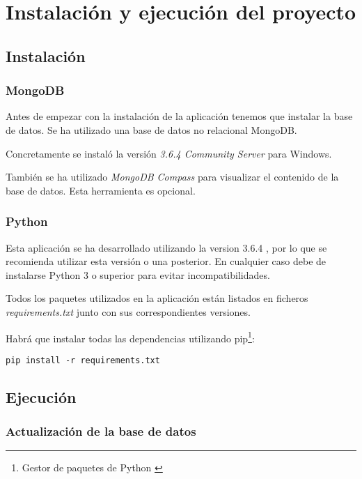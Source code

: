 \section{Instalación y ejecución del proyecto} \label{instalacionprogramador}

\subsection{Instalación}

\subsubsection{MongoDB}

Antes de empezar con la instalación de la aplicación tenemos que instalar la base de datos.
Se ha utilizado una base de datos no relacional MongoDB.

Concretamente se instaló la versión \textit{3.6.4 Community Server} \cite{misc:mongodb} para Windows.

También se ha utilizado \textit{MongoDB Compass} \cite{misc:mongodb} para visualizar el contenido de la base de datos. Esta herramienta es opcional.

\subsubsection{Python}

Esta aplicación se ha desarrollado utilizando la version 3.6.4 \cite{misc:python3}, por lo que se recomienda utilizar esta versión o una posterior. En cualquier caso debe de instalarse Python 3 o superior para evitar incompatibilidades.

Todos los paquetes utilizados en la aplicación están listados en ficheros \textit{requirements.txt} junto con sus correspondientes versiones.

Habrá que instalar todas las dependencias utilizando pip\footnote{Gestor de paquetes de Python \cite{wiki:pip}}:

\begin{lstlisting}
pip install -r requirements.txt
\end{lstlisting}

\subsection{Ejecución}

\subsubsection{Actualización de la base de datos}

